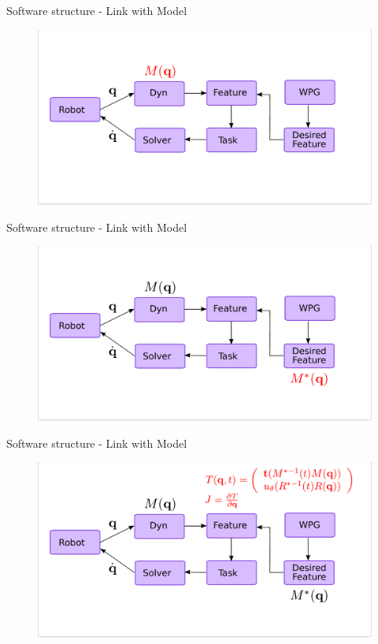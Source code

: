 
\begin{frame}{Software structure - Link with Model}
  \begin{figure}
    \includegraphics[width=\linewidth]{./figures/Concept-Theory-Fig-Finalv2M4}
  \end{figure}
\end{frame}

\begin{frame}{Software structure - Link with Model}
  \begin{figure}
    \includegraphics[width=\linewidth]{./figures/Concept-Theory-Fig-Finalv2M3}
  \end{figure}
\end{frame}

\begin{frame}{Software structure - Link with Model}
  \begin{figure}
    \includegraphics[width=\linewidth]{./figures/Concept-Theory-Fig-Finalv2M2}
  \end{figure}
\end{frame}


